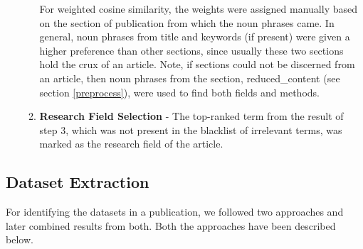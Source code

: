 \documentclass[runningheads]{llncs}
\begin{document}
\begin{itemize}
\begin{enumerate}
			For weighted cosine similarity, the weights were assigned manually based on the section of publication from which the noun phrases came. In general, noun phrases from title and keywords (if present) were given a higher preference than other sections, since usually these two sections hold the crux of an article. Note, if sections could not be discerned from an article, then noun phrases from the section, reduced\_content (see section \ref{preprocess}), were used to find both fields and methods.
			\smallskip
			\item \textbf{Research Field Selection} - The top-ranked term from the %
			result of step 3, which was not present in the blacklist of irrelevant terms, was marked as the research field of the article.
			\smallskip
		\end{enumerate}
	\end{itemize}
	
	
	
	
	
	
	
	
	\subsection{Dataset Extraction}
	For identifying the datasets in a publication, we followed two approaches and later combined results from both. Both the approaches have been described below.
	
\end{document}
